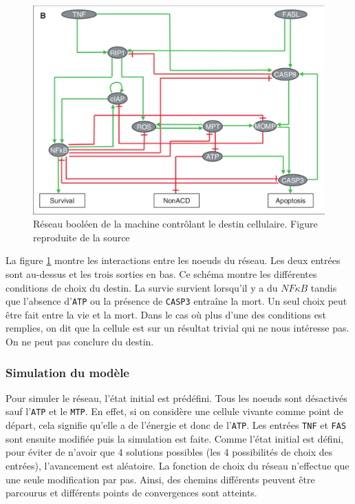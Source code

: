 \documentclass[11pt, a4paper]{article}
\begin{document}
\begin{figure}[position]
    \begin{center}
        \includegraphics[scale=0.4]{net_fadd}
        \caption{
            \label{net_fadd}
            Réseau booléen de la machine contrôlant le destin cellulaire.
            Figure reproduite de la source \cite{calzone2010}
        }
    \end{center}
\end{figure}

La figure \ref{net_fadd} montre les interactions entre les noeuds du réseau.
Les deux entrées sont au-dessus et les trois sorties en bas. Ce schéma montre
les différentes conditions de choix du destin. La survie survient lorsqu'il y a
du $NF\kappa B$ tandis que l'absence d'\texttt{ATP} ou la présence de
\texttt{CASP3} entraîne la mort. Un seul choix peut être fait entre la vie et
la mort. Dans le cas où plus d'une des conditions est remplies, on dit que la
cellule est sur un résultat trivial qui ne nous intéresse pas. On ne peut pas
conclure du destin.

\subsubsection{Simulation du modèle}
Pour simuler le réseau, l'état initial est prédéfini. Tous les noeuds sont
désactivés sauf l'\texttt{ATP} et le \texttt{MTP}. En effet, si on considère
une cellule vivante comme point de départ, cela signifie qu'elle a de l'énergie
et donc de l'\texttt{ATP}. Les entrées \texttt{TNF} et \texttt{FAS} sont
ensuite modifiée puis la simulation est faite. Comme l'état initial est défini,
pour éviter de n'avoir que 4 solutions possibles (les 4 possibilités de choix
des entrées), l'avancement est aléatoire. La fonction de choix du réseau
n'effectue que une seule modification par pas. Ainsi, des chemins différents
peuvent être parcourus et différents points de convergences sont atteints.
\end{document}
